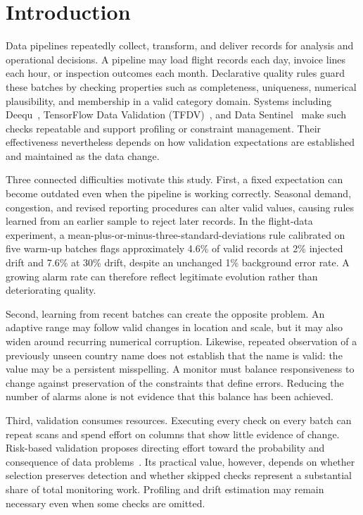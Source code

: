 \section{Introduction}
\label{sec:intro}

Data pipelines repeatedly collect, transform, and deliver records for analysis and operational decisions. A pipeline may load flight records each day, invoice lines each hour, or inspection outcomes each month. Declarative quality rules guard these batches by checking properties such as completeness, uniqueness, numerical plausibility, and membership in a valid category domain. Systems including Deequ~\cite{Schelter2018,Schelter2019}, TensorFlow Data Validation (TFDV)~\cite{Breck2019,Caveness2020}, and Data Sentinel~\cite{Swami2020} make such checks repeatable and support profiling or constraint management. Their effectiveness nevertheless depends on how validation expectations are established and maintained as the data change.

Three connected difficulties motivate this study. First, a fixed expectation can become outdated even when the pipeline is working correctly. Seasonal demand, congestion, and revised reporting procedures can alter valid values, causing rules learned from an earlier sample to reject later records. In the flight-data experiment, a mean-plus-or-minus-three-standard-deviations rule calibrated on five warm-up batches flags approximately 4.6\% of valid records at 2\% injected drift and 7.6\% at 30\% drift, despite an unchanged 1\% background error rate. A growing alarm rate can therefore reflect legitimate evolution rather than deteriorating quality.

Second, learning from recent batches can create the opposite problem. An adaptive range may follow valid changes in location and scale, but it may also widen around recurring numerical corruption. Likewise, repeated observation of a previously unseen country name does not establish that the name is valid: the value may be a persistent misspelling. A monitor must balance responsiveness to change against preservation of the constraints that define errors. Reducing the number of alarms alone is not evidence that this balance has been achieved.

Third, validation consumes resources. Executing every check on every batch can repeat scans and spend effort on columns that show little evidence of change. Risk-based validation proposes directing effort toward the probability and consequence of data problems~\cite{FoidlFelderer2019}. Its practical value, however, depends on whether selection preserves detection and whether skipped checks represent a substantial share of total monitoring work. Profiling and drift estimation may remain necessary even when some checks are omitted.

